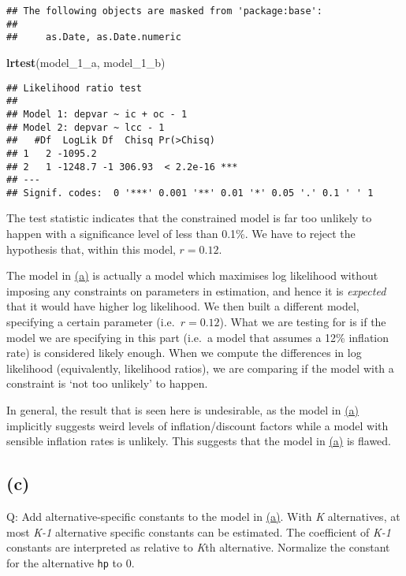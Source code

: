 \documentclass[
]{article}
\newenvironment{Shaded}{\begin{snugshade}}{\end{snugshade}}
\newcommand{\DecValTok}[1]{\textcolor[rgb]{0.00,0.00,0.81}{#1}}
\newcommand{\KeywordTok}[1]{\textcolor[rgb]{0.13,0.29,0.53}{\textbf{#1}}}
\newcommand{\NormalTok}[1]{#1}
\begin{document}
\begin{verbatim}
## The following objects are masked from 'package:base':
## 
##     as.Date, as.Date.numeric
\end{verbatim}

\begin{Shaded}
\begin{Highlighting}[]
\KeywordTok{lrtest}\NormalTok{(model_}\DecValTok{1}\NormalTok{_a, model_}\DecValTok{1}\NormalTok{_b)}
\end{Highlighting}
\end{Shaded}

\begin{verbatim}
## Likelihood ratio test
## 
## Model 1: depvar ~ ic + oc - 1
## Model 2: depvar ~ lcc - 1
##   #Df  LogLik Df  Chisq Pr(>Chisq)    
## 1   2 -1095.2                         
## 2   1 -1248.7 -1 306.93  < 2.2e-16 ***
## ---
## Signif. codes:  0 '***' 0.001 '**' 0.01 '*' 0.05 '.' 0.1 ' ' 1
\end{verbatim}

The test statistic indicates that the constrained model is far too
unlikely to happen with a significance level of less than 0.1\%. We have
to reject the hypothesis that, within this model, \(r=0.12\).

The model in \protect\hyperlink{onea}{(a)} is actually a model which
maximises log likelihood without imposing any constraints on parameters
in estimation, and hence it is \emph{expected} that it would have higher
log likelihood. We then built a different model, specifying a certain
parameter (i.e.~\(r=0.12\)). What we are testing for is if the model we
are specifying in this part (i.e.~a model that assumes a 12\% inflation
rate) is considered likely enough. When we compute the differences in
log likelihood (equivalently, likelihood ratios), we are comparing if
the model with a constraint is `not too unlikely' to happen.

In general, the result that is seen here is undesirable, as the model in
\protect\hyperlink{onea}{(a)} implicitly suggests weird levels of
inflation/discount factors while a model with sensible inflation rates
is unlikely. This suggests that the model in
\protect\hyperlink{onea}{(a)} is flawed.

\hypertarget{onec}{%
\subsection{(c)}\label{onec}}

Q: Add alternative-specific constants to the model in
\protect\hyperlink{onea}{(a)}. With \emph{K} alternatives, at most
\emph{K-1} alternative specific constants can be estimated. The
coefficient of \emph{K-1} constants are interpreted as relative to
\emph{K}th alternative. Normalize the constant for the alternative
\texttt{hp} to 0.
\end{document}
